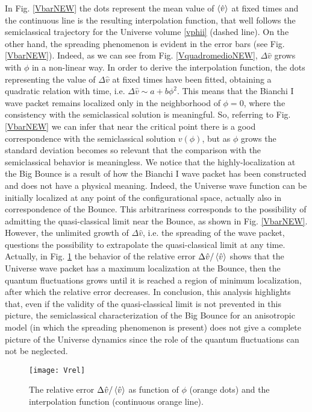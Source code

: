 \documentclass[aps,prd,twocolumn,nofootinbib,superscriptaddress]{revtex4-2}
\begin{document}
In Fig. \ref{VbarNEW} the dots represent the mean value of $\braket{\hat{v}}$ at fixed times and the continuous line is the resulting interpolation function, that well follows the semiclassical trajectory for the Universe volume \eqref{vphii} (dashed line). On the other hand, the spreading phenomenon is evident in the error bars (see Fig. \ref{VbarNEW}). Indeed, as we can see from Fig. \ref{VquadromedioNEW}, $\Delta\hat{v}$ grows with $\phi$ in a non-linear way. In order to derive the interpolation function, the dots representing the value of $\Delta\hat{v}$ at fixed times have been fitted, obtaining a quadratic relation with time, i.e. $\Delta\hat{v}\sim a+b\phi^2$. This means that the Bianchi I wave packet remains localized only in the neighborhood of $\phi=0$, where the consistency with the semiclassical solution is meaningful. So, referring to Fig. \ref{VbarNEW} we can infer that near the critical point there is a good correspondence with the semiclassical solution $v(\phi)$, but as $\phi$ grows the standard deviation becomes so relevant that the comparison with the semiclassical behavior is meaningless. We notice that the highly-localization at the Big Bounce is a result of how the Bianchi I wave packet has been constructed and does not have a physical meaning. Indeed, the Universe wave function can be initially localized at any point of the configurational space, actually also in correspondence of the Bounce. This arbitrariness corresponds to the possibility of admitting the quasi-classical limit near the Bounce, as shown in Fig. \ref{VbarNEW}. However, the unlimited growth of $\Delta\hat{v}$, i.e. the spreading of the wave packet, questions the possibility to extrapolate  the quasi-classical limit at any time. Actually, in Fig. \ref{Vrel} the behavior of the relative error $\Delta\hat{v}/\braket{\hat{v}}$ shows that the Universe wave packet has a maximum  localization at the Bounce, then the quantum fluctuations grows until it is reached a region of minimum localization, after which the relative error decreases. In conclusion, this analysis highlights that, even if the validity of the quasi-classical limit is not prevented in this picture, the semiclassical characterization of the Big Bounce for an anisotropic model (in which the spreading phenomenon is present) does not give a complete picture of the Universe dynamics since the role of the quantum fluctuations can not be neglected.

\begin{figure}
	\centering
	\texttt{[image: Vrel]}
	\caption{The relative error $\Delta\hat{v}/\braket{\hat{v}}$ as function of $\phi$ (orange dots) and the interpolation function (continuous orange line).}
	\label{Vrel}
\end{figure}
\end{document}
